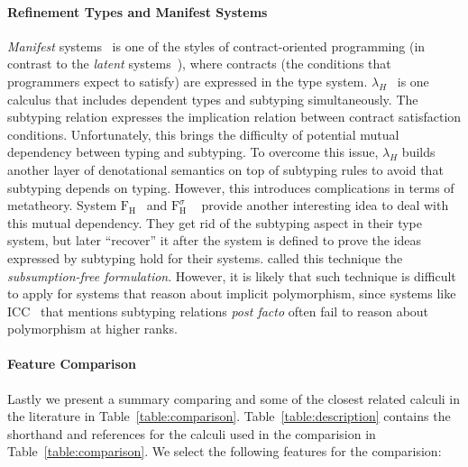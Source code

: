 \paragraph{Refinement Types and Manifest Systems}

\emph{Manifest} systems~\citep{manifestcontracts} is one of the styles of
contract-oriented programming (in contrast to the \emph{latent} systems~\citep{latentcontracts}),
where contracts (the conditions that programmers expect to satisfy) are expressed
in the type system. $\lambda_H$~\citep{hybridtypes,manifestcontracts} is one calculus that
includes dependent types and subtyping simultaneously. The subtyping relation
expresses the implication relation between contract satisfaction conditions. Unfortunately,
this brings the difficulty of potential mutual dependency between typing and subtyping.
To overcome this issue, $\lambda_H$ builds another layer of denotational semantics on top of
subtyping rules to avoid that subtyping depends on typing. However, this introduces
complications in terms of metatheory.
System $\mathrm{F}_\mathrm{H}$~\citep{fh} and $\mathrm{F}_\mathrm{H}^\sigma$
~\citep{fhsigma} provide another
interesting idea to deal with this mutual dependency. They get rid of the
subtyping aspect in their type system, but later ``recover'' it after
the system is defined to prove the ideas expressed by subtyping hold for their systems.
\citet{fhsigma} called this technique the \emph{subsumption-free formulation}.
However, it is likely that such technique is difficult to apply for systems that
reason about implicit polymorphism, since
systems like ICC~\citep{miquel2001implicit} that mentions subtyping relations
\emph{post facto} often fail to reason about polymorphism at higher ranks.

\paragraph{Feature Comparison}
Lastly we present a summary comparing \name and some of the closest related calculi
in the literature in Table~\ref{table:comparison}. Table~\ref{table:description} contains the
shorthand and references for the calculi used in the comparision in Table~\ref{table:comparison}.
We select the following features for the comparision:

